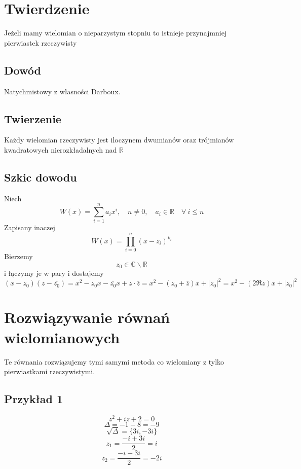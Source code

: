\documentclass[11pt]{article}
\begin{document}
\section{Twierdzenie}
Jeżeli mamy wielomian o nieparzystym stopniu to istnieje przynajmniej pierwiastek rzeczywisty
\subsection{Dowód}
Natychmistowy z własności Darboux.

\subsection{Twierzenie}
Każdy wielomian rzeczywisty jest iloczynem dwumianów oraz trójmianów kwadratowych nierozkładalnych nad $\mathbb{R}$
\subsection{Szkic dowodu}
Niech
$$ W(x) = \sum_{i=1}^{n} a_ix^i , \quad n \not = 0 , \quad a_i \in \mathbb{R} \quad  \forall\ i \leq n $$
Zapisany inaczej
$$ W(x) = \prod_{i=0}^{n} (x-z_i)^{k_i} $$
Bierzemy $$ z_0 \in \mathbb{C} \backslash \mathbb{R}$$
i łączymy je w pary i dostajemy
$$ (x-z_0)(z-\overline{z_0}) = x^2 -z_0x -\overline{z_0}x + z \cdot \overline{z} = x^2 -(z_0 + \overline{z})x + |z_0|^2  = x^2 - (2\Re z)x + |z_0|^2$$

\newpage
\section{Rozwiązywanie równań wielomianowych}
Te równania rozwiązujemy tymi samymi metoda co wielomiany z tylko pierwiastkami rzeczywistymi.

\subsection{Przykład 1}
$$ z^2 + iz + 2 = 0 $$
$$ \Delta = -1 - 8 = -9 $$
$$ \sqrt{\Delta} = \{ 3i , -3i \} $$
$$ z_1 = \frac{-i+3i}{2} = i$$
$$ z_2 = \frac{-i-3i}{2} = -2i $$
\end{document}
